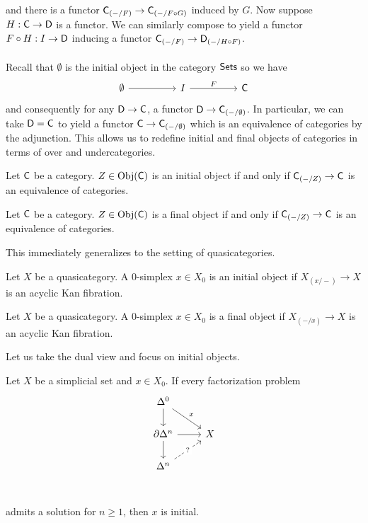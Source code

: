 and there is a functor $\mathsf{C}_{(-/F)}\to\mathsf{C}_{(-/F\circ G)}$ induced by $G$. Now suppose $H:\mathsf{C}\to\mathsf{D}$ is a functor. We can similarly compose to yield a functor $F\circ H:I\to\mathsf{D}$ inducing a functor $\mathsf{C}_{(-/F)}\to\mathsf{D}_{(-/H\circ F)}$. 
\\\\
Recall that $\emptyset$ is the initial object in the category $\mathsf{Sets}$ so we have 
$$%
\begin{tikzcd}
	\emptyset && I && \Csf
	\arrow[from=1-1, to=1-3]
	\arrow["F", from=1-3, to=1-5]
\end{tikzcd}$$
and consequently for any $\mathsf{D}\to\mathsf{C}$, a functor $\mathsf{D}\to\mathsf{C}_{(-/\emptyset)}$. In particular, we can take $\mathsf{D}=\mathsf{C}$ to yield a functor $\mathsf{C}\to\mathsf{C}_{(-/\emptyset)}$ which is an equivalence of categories by the adjunction. 
This allows us to redefine initial and final objects of categories in terms of over and undercategories. 
\begin{definition}
  Let $\mathsf{C}$ be a category. $Z\in\mathrm{Obj}(\mathsf{C})$ is an initial object if and only if $\mathsf{C}_{(-/Z)}\to\mathsf{C}$ is an equivalence of categories.  
\end{definition}
\begin{definition}
  Let $\mathsf{C}$ be a category. $Z\in\mathrm{Obj}(\mathsf{C})$ is a final object if and only if $\mathsf{C}_{(-/Z)}\to\mathsf{C}$ is an equivalence of categories. 
\end{definition}
This immediately generalizes to the setting of quasicategories. 
\begin{definition}\label{def: initial object quasicategory}
  Let $X$ be a quasicategory. A 0-simplex $x\in X_{0}$ is an initial object if $X_{(x/-)}\to X$ is an acyclic Kan fibration. 
\end{definition}
\begin{definition}\label{def: final object quasicategory}
  Let $X$ be a quasicategory. A 0-simplex $x\in X_{0}$ is a final object if $X_{(-/x)}\to X$ is an acyclic Kan fibration. 
\end{definition}
Let us take the dual view and focus on initial objects. 
\begin{proposition}
  Let $X$ be a simplicial set and $x\in X_{0}$. If every factorization problem 
  $$%
  \begin{tikzcd}
    {\Delta^{0}} \\
    {\partial\Delta^{n}} & X \\
    {\Delta^{n}} \\
    \arrow["x", from=1-1, to=2-2]
    \arrow[from=1-1, to=2-1]
    \arrow[from=2-1, to=3-1]
    \arrow[from=2-1, to=2-2]
    \arrow["{?}"{description}, dashed, from=3-1, to=2-2]
  \end{tikzcd}$$
  admits a solution for $n\geq 1$, then $x$ is initial. 
\end{proposition}
